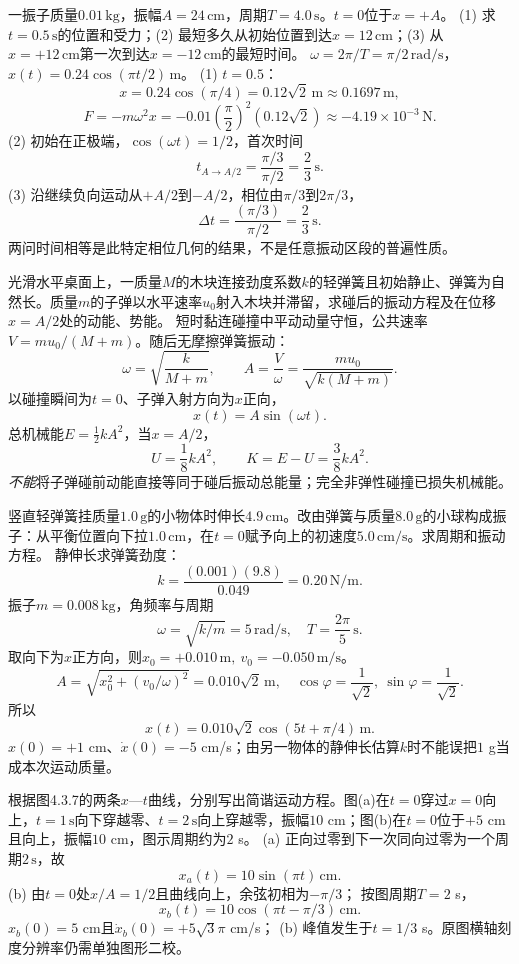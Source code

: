 \problemtext 一振子质量$0.01\,\mathrm{kg}$，振幅$A=24\,\mathrm{cm}$，周期$T=4.0\,\mathrm s$。$t=0$位于$x=+A$。
(1) 求$t=0.5\,\mathrm s$的位置和受力；(2) 最短多久从初始位置到达$x=12\,\mathrm{cm}$；(3) 从$x=+12\,\mathrm{cm}$第一次到达$x=-12\,\mathrm{cm}$的最短时间。
\workings
$\omega=2\pi/T=\pi/2\,\mathrm{rad/s}$，
$x(t)=0.24\cos(\pi t/2)\,\mathrm m$。
(1) $t=0.5$：
\[
\boxed{x=0.24\cos(\pi/4)=0.12\sqrt2\,\mathrm m\approx0.1697\,\mathrm m},
\]
\[
\boxed{F=-m\omega^2x
=-0.01\left(\frac\pi2\right)^2(0.12\sqrt2)
\approx-4.19\times10^{-3}\,\mathrm N}.
\]
(2) 初始在正极端，$\cos(\omega t)=1/2$，首次时间
\[
\boxed{t_{A\to A/2}=\frac{\pi/3}{\pi/2}=\frac23\,\mathrm s}.
\]
(3) 沿继续负向运动从$+A/2$到$-A/2$，相位由$\pi/3$到$2\pi/3$，
\[
\boxed{\Delta t=\frac{(\pi/3)}{\pi/2}=\frac23\,\mathrm s}.
\]
\crosscheck 两问时间相等是此特定相位几何的结果，不是任意振动区段的普遍性质。

\problemtext 光滑水平桌面上，一质量$M$的木块连接劲度系数$k$的轻弹簧且初始静止、弹簧为自然长。质量$m$的子弹以水平速率$u_0$射入木块并滞留，求碰后的振动方程及在位移$x=A/2$处的动能、势能。
\workings
短时黏连碰撞中平动动量守恒，公共速率
$V=mu_0/(M+m)$。随后无摩擦弹簧振动：
\[
\omega=\sqrt{\frac{k}{M+m}},\qquad
A=\frac{V}{\omega}
=\frac{mu_0}{\sqrt{k(M+m)}}.
\]
以碰撞瞬间为$t=0$、子弹入射方向为$x$正向，
\[
\boxed{x(t)=A\sin(\omega t)}.
\]
总机械能$E=\frac12kA^2$，当$x=A/2$，
\[
\boxed{U=\frac18kA^2},\qquad
\boxed{K=E-U=\frac38kA^2}.
\]
\crosscheck \emph{不能}将子弹碰前动能直接等同于碰后振动总能量；完全非弹性碰撞已损失机械能。

\problemtext 竖直轻弹簧挂质量$1.0\,\mathrm g$的小物体时伸长$4.9\,\mathrm{cm}$。改由弹簧与质量$8.0\,\mathrm g$的小球构成振子：从平衡位置向下拉$1.0\,\mathrm{cm}$，在$t=0$赋予向上的初速度$5.0\,\mathrm{cm/s}$。求周期和振动方程。
\workings
静伸长求弹簧劲度：
\[
k=\frac{(0.001)(9.8)}{0.049}=0.20\,\mathrm{N/m}.
\]
振子$m=0.008\,\mathrm{kg}$，角频率与周期
\[
\omega=\sqrt{k/m}=5\,\mathrm{rad/s},\quad
\boxed{T=\frac{2\pi}{5}\,\mathrm s}.
\]
取向下为$x$正方向，则$x_0=+0.010\,\mathrm m,\ v_0=-0.050\,\mathrm{m/s}$。
\[
A=\sqrt{x_0^2+(v_0/\omega)^2}
=0.010\sqrt2\,\mathrm m,\quad
\cos\varphi=\frac1{\sqrt2},\ \sin\varphi=\frac1{\sqrt2}.
\]
所以
\[
\boxed{x(t)=0.010\sqrt2\cos(5t+\pi/4)\,\mathrm m}.
\]
\crosscheck $x(0)=+1$ cm、$\dot x(0)=-5$ cm/s；由另一物体的静伸长估算$k$时不能误把$1$ g当成本次运动质量。

\problemtext 根据图4.3.7的两条$x$—$t$曲线，分别写出简谐运动方程。图(a)在$t=0$穿过$x=0$向上，$t=1\,\mathrm s$向下穿越零、$t=2\,\mathrm s$向上穿越零，振幅$10$ cm；图(b)在$t=0$位于$+5$ cm且向上，振幅$10$ cm，图示周期约为$2$ s。
\workings
(a) 正向过零到下一次同向过零为一个周期$2\,\mathrm s$，故
\[
\boxed{x_a(t)=10\sin(\pi t)\,\mathrm{cm}}.
\]
(b) 由$t=0$处$x/A=1/2$且曲线向上，余弦初相为$-\pi/3$；
按图周期$T=2$ s，
\[
\boxed{x_b(t)=10\cos(\pi t-\pi/3)\,\mathrm{cm}}.
\]
\crosscheck $x_b(0)=5$ cm且$\dot x_b(0)=+5\sqrt3\pi$ cm/s；
(b) 峰值发生于$t=1/3$ s。原图横轴刻度分辨率仍需单独图形二校。

